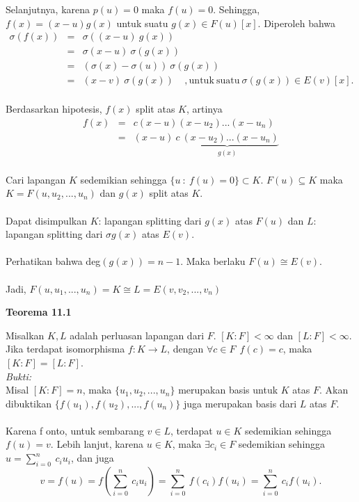 \begin{itemize}
\\ \\	Selanjutnya, karena $p(u)=0$ maka $f(u)=0.$ Sehingga, $f(x)=(x-u)g(x)$ untuk suatu $g(x) \in F(u)[x].$ Diperoleh bahwa
	$$\begin{array}{rcl}
	\sigma (f(x)) &=& \sigma ((x-u)~g(x))\\
	&=& \sigma (x-u)~\sigma(g(x))\\
	&=& (\sigma(x)-\sigma(u))~\sigma(g(x))\\
	&=& (x-v)~\sigma(g(x))~~~~~, \mathrm{untuk~suatu~} \sigma(g(x))\in E(v)[x].
	\end{array}$$
\\ 	Berdasarkan hipotesis, $f(x)$ split atas $K$, artinya
	$$\begin{array}{rcl}
	f(x)&=&c(x-u)(x-u_2)...(x-u_n)\\
	&=& (x-u) ~\underbrace{c~(x-u_2)...(x-u_n)}_{g(x)}
	\end{array}$$
\\	Cari lapangan $K$ sedemikian sehingga $\{u~:~f(u)=0\} \subset K$. $F(u)\subseteq K$ maka $K=F(u,u_2,...,u_n)$ dan $g(x)$ split atas $K$.
\\ \\ 	Dapat disimpulkan $K$: lapangan splitting dari $g(x)$ atas $F(u)$ dan $L$: lapangan splitting dari $\sigma g(x)$ atas $E(v)$.
\\ \\ 	Perhatikan bahwa deg$(g(x))=n-1$. Maka berlaku $F(u)\cong E(v).$
\\ \\ 	Jadi, $F(u,u_1,...,u_n)=K\cong L =E(v,v_2,...,v_n)$
	\end{itemize}
	\textbf{Teorema 11.1}
\par 	Misalkan $K,L$ adalah perluasan lapangan dari $F$. $[K:F]< \infty$ dan $[L:F]< \infty$. Jika terdapat isomorphisma $f:K\longrightarrow L$, dengan $\forall c \in F~~f(c)=c$, maka $[K:F]=[L:F]$.
\\
	\textit{Bukti:}
\\	Misal $[K:F]=n$, maka $\{u_1,u_2,...,u_n\}$ merupakan basis untuk $K$ atas $F$. Akan dibuktikan $\{f(u_1),f(u_2),...,f(u_n)\}$ juga merupakan basis dari $L$ atas $F$.\\ \\
	Karena f onto, untuk sembarang $v \in L$, terdapat $u\in K$ sedemikian sehingga $f(u)=v.$ Lebih lanjut, karena $u \in K$, maka $\exists c_i \in F$ sedemikian sehingga $u= \sum^{n}_{i=0} \ c_iu_i$, dan juga $$v=f(u)=f( \sum^{n}_{i=0} \ c_iu_i)= \sum^{n}_{i=0} \ 	f(c_i)f(u_i) =  \sum^{n}_{i=0} \ c_if(u_i).$$
